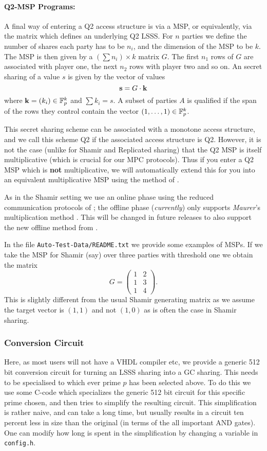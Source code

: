 \paragraph{Q2-MSP Programs:}
A final way of entering a Q2 access structure is via a MSP, or equivalently,
via the matrix which defines an underlying Q2 LSSS.
For $n$ parties we define the number of shares each party has to be
$n_i$, and the dimension of the MSP to be $k$. The MSP is then given
by a $(\sum n_i) \times k$ matrix $G$.
The first $n_1$ rows of $G$ are associated with player one, the
next $n_2$ rows with player two and so on.
An secret sharing of a value $s$ is given by the vector of values
\[ \mathbf{s} = G \cdot \mathbf{k} \]
where $\mathbf{k} = (k_i) \in {\mathbb{F}}_p^k$ and $\sum k_i =s$.
A subset of parties $A$ is qualified if the span of the rows they control
contain the vector $(1,\ldots,1) \in {\mathbb{F}}_p^k$.

This secret sharing scheme can be associated with a monotone
access structure, and we call this scheme Q2 if the associated
access structure is Q2.
However, it is not the case (unlike for Shamir and Replicated sharing)
that the Q2 MSP is itself multiplicative (which is crucial for
our MPC protocols).
Thus if you enter a Q2 MSP which is {\bf not} multiplicative, we
will automatically extend this for you into an equivalent multiplicative MSP
using the method of \cite{CDM00}.

As in the Shamir setting we use an online phase using the reduced communication
protocols of \cite{KRSW};
the offline phase ({\em currently}) only supports {\em Maurer}'s multiplication method
\cite{Maurer}.
This will be changed in future releases to also support the new offline method from
\cite{SW18}.

In the file \verb+Auto-Test-Data/README.txt+ we provide some examples
of MSPs. If we take the MSP for Shamir (say) over three parties with threshold
one we obtain the matrix
\[
   G = \left( \begin{array}{cc}
      1 & 2 \\ 1 & 3 \\ 1 & 4
       \end{array} \right).
\]
This is slightly different from the usual Shamir generating matrix
as we assume the target vector is $(1,1)$ and not $(1,0)$ as is often
the case in Shamir sharing.


\subsubsection{Conversion Circuit}
Here, as most users will not have a VHDL compiler etc, we provide
a generic 512 bit conversion circuit for turning an LSSS sharing
into a GC sharing.
This needs to be specialised to which ever prime $p$ has been selected above.
To do this we use some C-code  which specializes the generic 512
bit circuit for this specific prime chosen, and then tries
to simplify the resulting circuit. This simplification is rather
naive, and can take a long time, but usually results in a circuit ten percent
less in size than the original (in terms of the all important AND gates).
One can modify how long is spent in the simplification by
changing a variable in \verb+config.h+.

